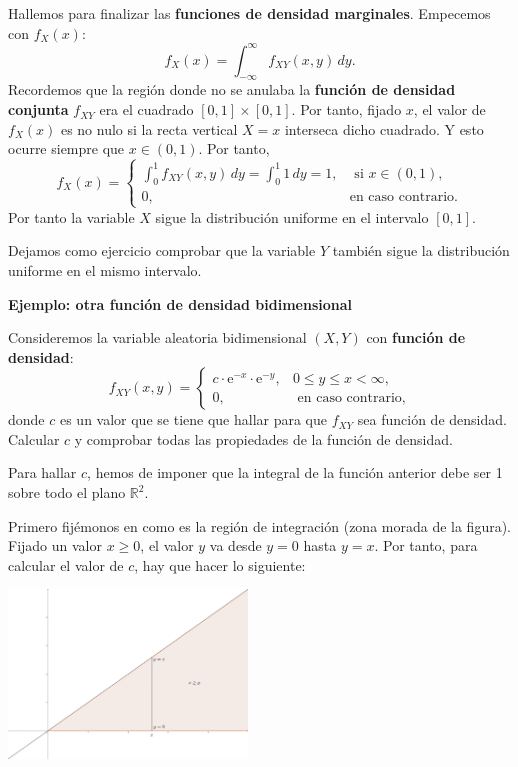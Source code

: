 \documentclass[
  letterpaper,
  DIV=11,
  numbers=noendperiod]{scrreprt}
\begin{document}
Hallemos para finalizar las \textbf{funciones de densidad marginales}.
Empecemos con \(f_X(x)\): \[
f_X(x)=\int_{-\infty}^\infty  f_{XY}(x,y)\, dy.
\] Recordemos que la región donde no se anulaba la \textbf{función de
densidad conjunta} \(f_{XY}\) era el cuadrado \([0,1]\times [0,1]\). Por
tanto, fijado \(x\), el valor de \(f_X(x)\) es no nulo si la recta
vertical \(X=x\) interseca dicho cuadrado. Y esto ocurre siempre que
\(x\in (0,1)\). Por tanto, \[
f_X(x)=\begin{cases}
\int_{0}^1  f_{XY}(x,y)\, dy=\int_{0}^1  1\, dy=1, & \mbox{ si }x\in (0,1),\\
0, & \mbox{en caso contrario.}
\end{cases}
\] Por tanto la variable \(X\) sigue la distribución uniforme en el
intervalo \([0,1]\).

Dejamos como ejercicio comprobar que la variable \(Y\) también sigue la
distribución uniforme en el mismo intervalo.

\textbf{Ejemplo: otra función de densidad bidimensional}

Consideremos la variable aleatoria bidimensional \((X,Y)\) con
\textbf{función de densidad}: \[
f_{XY}(x,y)=\begin{cases}
c\cdot \mathrm{e}^{-x}\cdot\mathrm{e}^{-y}, & 0\leq y\leq x < \infty,\\
0, & \mbox{ en caso contrario,}
\end{cases}
\] donde \(c\) es un valor que se tiene que hallar para que \(f_{XY}\)
sea función de densidad. Calcular \(c\) y comprobar todas las
propiedades de la función de densidad.

Para hallar \(c\), hemos de imponer que la integral de la función
anterior debe ser 1 sobre todo el plano \(\mathbb{R}^2\).

Primero fijémonos en como es la región de integración (zona morada de la
figura). Fijado un valor \(x\geq 0\), el valor \(y\) va desde \(y=0\)
hasta \(y=x\). Por tanto, para calcular el valor de \(c\), hay que hacer
lo siguiente:

\includegraphics[width=2.5in,height=\textheight]{Images/Ejemplo2Bidi.png}
\end{document}
